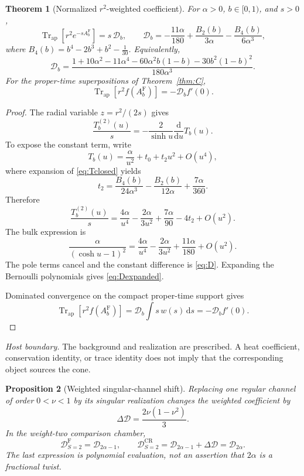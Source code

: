 \documentclass[11pt,a4paper]{article}
\newcommand{\dd}{\mathrm d}
\newcommand{\Fr}{\mathrm F}
\newcommand{\CR}{\mathrm{CR}}
\newcommand{\ApTr}{\operatorname{Tr}_{\mathrm{ap}}}
\newcommand{\Dcal}{\mathcal D}
\theoremstyle{plain}
\newtheorem{theorem}{Theorem}[section]
\newtheorem{proposition}[theorem]{Proposition}
\theoremstyle{definition}
\theoremstyle{remark}
\numberwithin{equation}{section}
\newcommand{\nonsource}{%
  \par\smallskip\noindent
  \emph{Host boundary.}
  The background and realization are prescribed.
  A heat coefficient, conservation identity, or trace identity does
  not imply that the corresponding object sources the cone.%
}
\begin{document}
\begin{theorem}[Normalized \(r^2\)-weighted coefficient]
\label{thm:D}
For \(\alpha>0\), \(b\in[0,1)\), and \(s>0\),
\begin{equation}
 \ApTr[r^2e^{-sA_b^\Fr}]=s\,\Dcal_b,
 \qquad
 \Dcal_b=
 -\frac{11\alpha}{180}
 +\frac{B_2(b)}{3\alpha}
 -\frac{B_4(b)}{6\alpha^3},
 \label{eq:D}
\end{equation}
where
\(B_4(b)=b^4-2b^3+b^2-\tfrac1{30}\).
Equivalently,
\begin{equation}
 \Dcal_b=
 \frac{1+10\alpha^2-11\alpha^4
       -60\alpha^2b(1-b)-30b^2(1-b)^2}
      {180\alpha^3}.
 \label{eq:Dexpanded}
\end{equation}
For the proper-time superpositions of
Theorem~\ref{thm:C},
\begin{equation}
 \ApTr[r^2f(A_b^\Fr)]=-\Dcal_b f'(0).
 \label{eq:Dfunctional}
\end{equation}
\end{theorem}

\begin{proof}
The radial variable \(z=r^2/(2s)\) gives
\[
 \frac{T_b^{(2)}(u)}{s}
 =-\frac{2}{\sinh u}\frac{\dd}{\dd u}T_b(u).
\]
To expose the constant term, write
\[
 T_b(u)=\frac{\alpha}{u^2}+t_0+t_2u^2+O(u^4),
\]
where expansion of \eqref{eq:Tclosed} yields
\[
 t_2=\frac{B_4(b)}{24\alpha^3}
     -\frac{B_2(b)}{12\alpha}
     +\frac{7\alpha}{360}.
\]
Therefore
\[
 \frac{T_b^{(2)}(u)}s
 =\frac{4\alpha}{u^4}-\frac{2\alpha}{3u^2}
   +\frac{7\alpha}{90}-4t_2+O(u^2).
\]
The bulk expression is
\[
 \frac{\alpha}{(\cosh u-1)^2}
 =\frac{4\alpha}{u^4}-\frac{2\alpha}{3u^2}
   +\frac{11\alpha}{180}+O(u^2).
\]
The pole terms cancel and the constant difference is
\eqref{eq:D}. Expanding the Bernoulli polynomials gives
\eqref{eq:Dexpanded}.

Dominated convergence on the compact proper-time support gives
\[
 \ApTr[r^2f(A_b^\Fr)]
 =\Dcal_b\int s\,w(s)\,\dd s=-\Dcal_b f'(0).
\]
\end{proof}
\nonsource

\begin{proposition}[Weighted singular-channel shift]
\label{prop:Dflip}
Replacing one regular channel of order \(0<\nu<1\) by its
singular realization changes the weighted coefficient by
\begin{equation}
 \Delta\Dcal=\frac{2\nu(1-\nu^2)}3.
 \label{eq:Dflip}
\end{equation}
In the weight-two comparison chamber,
\[
 \Dcal_{S=2}^\Fr=\Dcal_{2\alpha-1},
 \qquad
 \Dcal_{S=2}^\CR
 =\Dcal_{2\alpha-1}+\Delta\Dcal
 =\Dcal_{2\alpha}.
\]
The last expression is polynomial evaluation, not an assertion
that \(2\alpha\) is a fractional twist.
\end{proposition}
\end{document}
